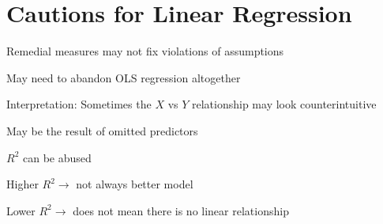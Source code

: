 \documentclass[12pt]{../notes}
\begin{document}
\section{Cautions for Linear Regression}
\bi
\item Remedial measures may not fix violations of assumptions
\bi
\item May need to abandon OLS regression altogether
\ei
\item Interpretation: Sometimes the $X$ vs $Y$ relationship may look counterintuitive
\bi
\item May be the result of omitted predictors
\ei
\item $R^2$ can be abused
\bi
\item Higher $R^2 \rightarrow$ not always better model
\item Lower $R^2 \rightarrow$ does not mean there is no linear relationship 
\ei
\ei


\end{document}
